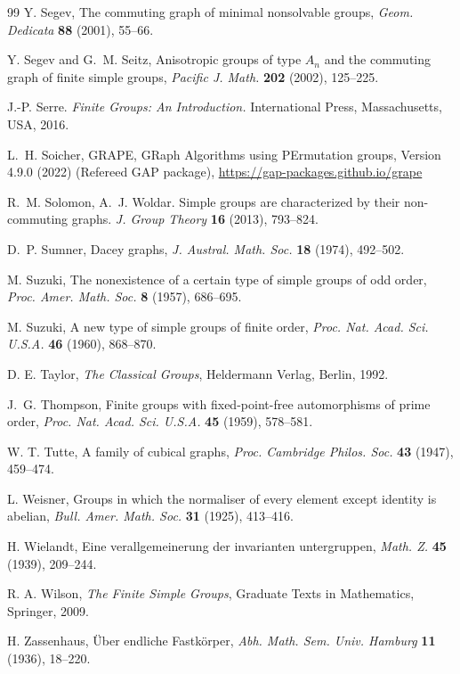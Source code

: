 \documentclass{elsarticle}
\begin{document}
\begin{thebibliography}{99}
Y. Segev,
The commuting graph of minimal nonsolvable groups,
\textit{Geom. Dedicata} \textbf{88} (2001), 55--66.

Y. Segev and G.~M. Seitz,
Anisotropic groups of type $A_n$ and the commuting graph of finite simple
groups,
\textit{Pacific J. Math.} \textbf{202} (2002), 125--225.

J.-P. Serre.
\textit{Finite Groups: An Introduction.}
International Press, Massachusetts, USA, 2016.

L.~H. Soicher,
GRAPE, GRaph Algorithms using PErmutation groups, Version 4.9.0 (2022)
(Refereed GAP package),
\url{https://gap-packages.github.io/grape}

R.~M. Solomon, A.~J. Woldar.
Simple groups are characterized by their non-commuting graphs.
\textit{J. Group Theory} \textbf{16} (2013), 793--824.

D.~P. Sumner,
Dacey graphs,
\textit{J. Austral. Math. Soc.} \textbf{18} (1974), 492--502.

M. Suzuki,
The nonexistence of a certain type of simple groups of odd order,
\textit{Proc. Amer. Math. Soc.} \textbf{8} (1957), 686--695.

M. Suzuki, A new type of simple groups of finite order,
\textit{Proc. Nat. Acad. Sci. U.S.A.} \textbf{46} (1960), 868--870.

D. E. Taylor,
\textit{The Classical Groups},
Heldermann Verlag, Berlin, 1992.

J.~G. Thompson,
Finite groups with fixed-point-free automorphisms of prime order,
\textit{Proc. Nat. Acad. Sci. U.S.A.} \textbf{45} (1959), 578--581.

W. T. Tutte,
A family of cubical graphs,
\textit{Proc. Cambridge Philos. Soc.} \textbf{43} (1947), 459--474.

L. Weisner,
Groups in which the normaliser of every element except identity is abelian,
\textit{Bull. Amer. Math. Soc.} \textbf{31} (1925), 413--416.

H. Wielandt,
Eine verallgemeinerung der invarianten untergruppen,
\textit{Math. Z.} \textbf{45} (1939), 209--244.

R. A. Wilson,
\textit{The Finite Simple Groups},
Graduate Texts in Mathematics, Springer, 2009.

H. Zassenhaus,
\"Uber endliche Fastk\"orper,
\emph{Abh. Math. Sem. Univ. Hamburg} \textbf{11} (1936), 18--220.

\end{thebibliography}
\end{document}
